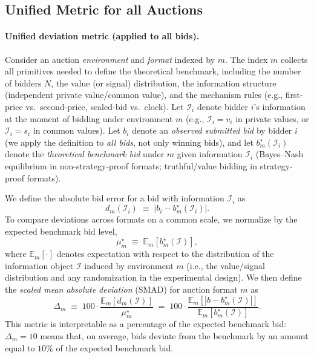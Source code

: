 \subsection{Unified Metric for all Auctions}\label{sec:method}

\paragraph{Unified deviation metric (applied to all bids).}
Consider an auction \emph{environment} and \emph{format} indexed by $m$.
The index $m$ collects all primitives needed to define the theoretical benchmark, including the number of bidders $N$, the value (or signal) distribution, the information structure (independent private value/common value), and the mechanism rules (e.g., first-price vs.\ second-price, sealed-bid vs.\ clock).
Let $\mathcal I_i$ denote bidder $i$'s information at the moment of bidding under environment $m$ (e.g., $\mathcal I_i=v_i$ in private values, or $\mathcal I_i=s_i$ in common values).
Let $b_{i}$ denote an \emph{observed submitted bid} by bidder $i$ (we apply the definition to \emph{all bids}, not only winning bids), and let $b_m^\star(\mathcal I_i)$ denote the \emph{theoretical benchmark bid} under $m$ given information $\mathcal I_i$ (Bayes--Nash equilibrium in non-strategy-proof formats; truthful/value bidding in strategy-proof formats).

\noindent We define the absolute bid error for a bid with information $\mathcal I_i$ as
\[
d_m(\mathcal I_i)\;\equiv\;\bigl|b_i - b_m^\star(\mathcal I_i)\bigr|.
\]
To compare deviations across formats on a common scale, we normalize by the expected benchmark bid level,
\[
\mu_m^\star \;\equiv\; \mathbb E_m\!\left[b_m^\star(\mathcal I)\right],
\]
where $\mathbb E_m[\cdot]$ denotes expectation with respect to the distribution of the information object $\mathcal I$ induced by environment $m$ (i.e., the value/signal distribution and any randomization in the experimental design).
We then define the \emph{scaled mean absolute deviation} (SMAD) for auction format $m$ as
\[
\Delta_m \;\equiv\; 100 \cdot \frac{\mathbb E_m\!\left[d_m(\mathcal I)\right]}{\mu_m^\star}
\;=\; 100 \cdot \frac{\mathbb E_m\!\left[\left|b-b_m^\star(\mathcal I)\right|\right]}{\mathbb E_m\!\left[b_m^\star(\mathcal I)\right]}.
\]
This metric is interpretable as a percentage of the expected benchmark bid: $\Delta_m=10$ means that, on average, bids deviate from the benchmark by an amount equal to $10\%$ of the expected benchmark bid.


